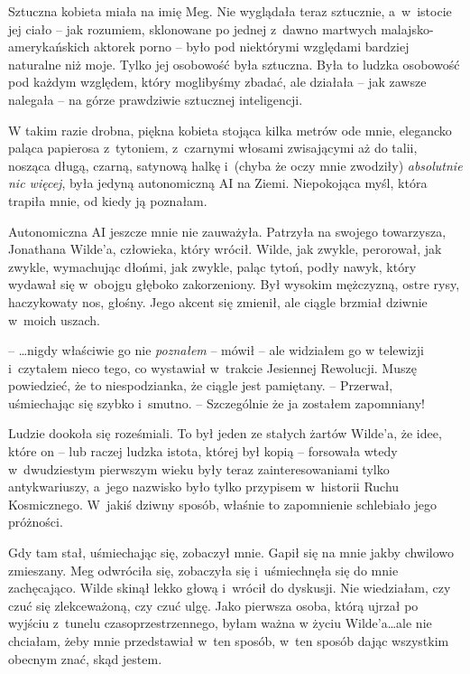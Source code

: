 \documentclass[oneside,polish,11pt,sfheadings]{mwbk}
\begin{document}
Sztuczna kobieta miała na imię Meg. Nie wyglądała teraz sztucznie, a~w~istocie jej ciało -- jak rozumiem, sklonowane po jednej z~dawno martwych
malajsko-amerykańskich aktorek porno -- było pod niektórymi względami
bardziej naturalne niż moje. Tylko jej osobowość była sztuczna. Była to
ludzka osobowość pod każdym względem, który moglibyśmy zbadać, ale
działała -- jak zawsze nalegała -- na górze prawdziwie sztucznej
inteligencji.

W takim razie drobna, piękna kobieta stojąca kilka metrów ode mnie,
elegancko paląca papierosa z~tytoniem, z~czarnymi włosami zwisającymi aż
do talii, nosząca długą, czarną, satynową halkę i~(chyba że oczy mnie
zwodziły) \textit{absolutnie nic więcej}, była jedyną autonomiczną AI na
Ziemi. Niepokojąca myśl, która trapiła mnie, od kiedy ją poznałam.

Autonomiczna AI jeszcze mnie nie zauważyła. Patrzyła na swojego
towarzysza, Jonathana Wilde'a, człowieka, który wrócił. Wilde, jak
zwykle, perorował, jak zwykle, wymachując dłońmi, jak zwykle, paląc
tytoń, podły nawyk, który wydawał się w~obojgu głęboko zakorzeniony. Był
wysokim mężczyzną, ostre rysy, haczykowaty nos, głośny. Jego akcent się
zmienił, ale ciągle brzmiał dziwnie w~moich uszach.

-- \ldots  nigdy właściwie go nie \textit{poznałem} -- mówił -- ale widziałem go
w telewizji i~czytałem nieco tego, co wystawiał w~trakcie Jesiennej
Rewolucji. Muszę powiedzieć, że to niespodzianka, że ciągle jest
pamiętany. -- Przerwał, uśmiechając się szybko i~smutno. -- Szczególnie że
ja zostałem zapomniany!

Ludzie dookoła się roześmiali. To był jeden ze stałych żartów Wilde'a,
że idee, które on -- lub raczej ludzka istota, której był kopią -- forsowała wtedy w~dwudziestym pierwszym wieku były teraz
zainteresowaniami tylko antykwariuszy, a~jego nazwisko było tylko
przypisem w~historii Ruchu Kosmicznego. W~jakiś dziwny sposób, właśnie
to zapomnienie schlebiało jego próżności.

Gdy tam stał, uśmiechając się, zobaczył mnie. Gapił się na mnie jakby
chwilowo zmieszany. Meg odwróciła się, zobaczyła się i~uśmiechnęła się
do mnie zachęcająco. Wilde skinął lekko głową i~wrócił do dyskusji. Nie
wiedziałam, czy czuć się zlekceważoną, czy czuć ulgę. Jako pierwsza
osoba, którą ujrzał po wyjściu z~tunelu czasoprzestrzennego, byłam ważna
w życiu Wilde'a\ldots  ale nie chciałam, żeby mnie przedstawiał w~ten
sposób, w~ten sposób dając wszystkim obecnym znać, skąd jestem.
\end{document}
